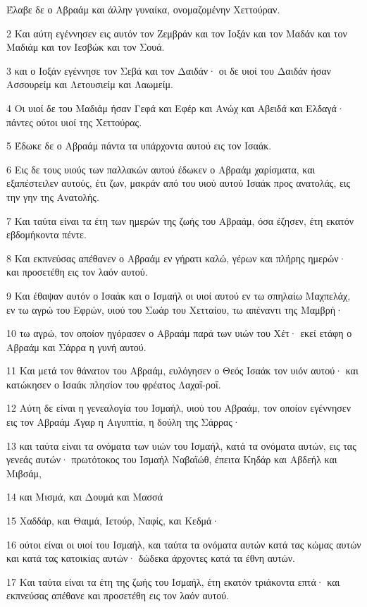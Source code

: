 \par Έλαβε δε ο Αβραάμ και άλλην γυναίκα, ονομαζομένην Χεττούραν.
\par 2 Και αύτη εγέννησεν εις αυτόν τον Ζεμβράν και τον Ιοξάν και τον Μαδάν και τον Μαδιάμ και τον Ιεσβώκ και τον Σουά.
\par 3 και ο Ιοξάν εγέννησε τον Σεβά και τον Δαιδάν· οι δε υιοί του Δαιδάν ήσαν Ασσουρείμ και Λετουσιείμ και Λαωμείμ.
\par 4 Οι υιοί δε του Μαδιάμ ήσαν Γεφά και Εφέρ και Ανώχ και Αβειδά και Ελδαγά· πάντες ούτοι υιοί της Χεττούρας.
\par 5 Έδωκε δε ο Αβραάμ πάντα τα υπάρχοντα αυτού εις τον Ισαάκ.
\par 6 Εις δε τους υιούς των παλλακών αυτού έδωκεν ο Αβραάμ χαρίσματα, και εξαπέστειλεν αυτούς, έτι ζων, μακράν από του υιού αυτού Ισαάκ προς ανατολάς, εις την γην της Ανατολής.
\par 7 Και ταύτα είναι τα έτη των ημερών της ζωής του Αβραάμ, όσα έζησεν, έτη εκατόν εβδομήκοντα πέντε.
\par 8 Και εκπνεύσας απέθανεν ο Αβραάμ εν γήρατι καλώ, γέρων και πλήρης ημερών· και προσετέθη εις τον λαόν αυτού.
\par 9 Και έθαψαν αυτόν ο Ισαάκ και ο Ισμαήλ οι υιοί αυτού εν τω σπηλαίω Μαχπελάχ, εν τω αγρώ του Εφρών, υιού του Σωάρ του Χετταίου, τω απέναντι της Μαμβρή·
\par 10 τω αγρώ, τον οποίον ηγόρασεν ο Αβραάμ παρά των υιών του Χέτ· εκεί ετάφη ο Αβραάμ και Σάρρα η γυνή αυτού.
\par 11 Και μετά τον θάνατον του Αβραάμ, ευλόγησεν ο Θεός Ισαάκ τον υιόν αυτού· και κατώκησεν ο Ισαάκ πλησίον του φρέατος Λαχαΐ-ροΐ.
\par 12 Αύτη δε είναι η γενεαλογία του Ισμαήλ, υιού του Αβραάμ, τον οποίον εγέννησεν εις τον Αβραάμ Άγαρ η Αιγυπτία, η δούλη της Σάρρας·
\par 13 και ταύτα είναι τα ονόματα των υιών του Ισμαήλ, κατά τα ονόματα αυτών, εις τας γενεάς αυτών· πρωτότοκος του Ισμαήλ Ναβαϊώθ, έπειτα Κηδάρ και Αβδεήλ και Μιβσάμ,
\par 14 και Μισμά, και Δουμά και Μασσά
\par 15 Χαδδάρ, και Θαιμά, Ιετούρ, Ναφίς, και Κεδμά·
\par 16 ούτοι είναι οι υιοί του Ισμαήλ, και ταύτα τα ονόματα αυτών κατά τας κώμας αυτών και κατά τας κατοικίας αυτών· δώδεκα άρχοντες κατά τα έθνη αυτών.
\par 17 Και ταύτα είναι τα έτη της ζωής του Ισμαήλ, έτη εκατόν τριάκοντα επτά· και εκπνεύσας απέθανε και προσετέθη εις τον λαόν αυτού.
